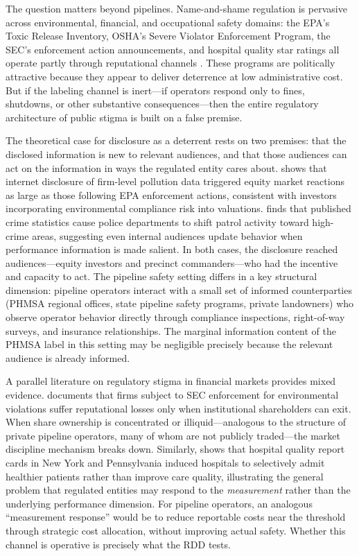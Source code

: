 \documentclass[12pt]{article}
\begin{document}
The question matters beyond pipelines. Name-and-shame regulation is pervasive across environmental, financial, and occupational safety domains: the EPA's Toxic Release Inventory, OSHA's Severe Violator Enforcement Program, the SEC's enforcement action announcements, and hospital quality star ratings all operate partly through reputational channels \citep{hamilton1995pollution, jin2003production, dranove2003more}. These programs are politically attractive because they appear to deliver deterrence at low administrative cost. But if the labeling channel is inert---if operators respond only to fines, shutdowns, or other substantive consequences---then the entire regulatory architecture of public stigma is built on a false premise.

The theoretical case for disclosure as a deterrent rests on two premises: that the disclosed information is new to relevant audiences, and that those audiences can act on the information in ways the regulated entity cares about. \citet{di2004internet} shows that internet disclosure of firm-level pollution data triggered equity market reactions as large as those following EPA enforcement actions, consistent with investors incorporating environmental compliance risk into valuations. \citet{mastrobuoni2020police} finds that published crime statistics cause police departments to shift patrol activity toward high-crime areas, suggesting even internal audiences update behavior when performance information is made salient. In both cases, the disclosure reached audiences---equity investors and precinct commanders---who had the incentive and capacity to act. The pipeline safety setting differs in a key structural dimension: pipeline operators interact with a small set of informed counterparties (PHMSA regional offices, state pipeline safety programs, private landowners) who observe operator behavior directly through compliance inspections, right-of-way surveys, and insurance relationships. The marginal information content of the PHMSA label in this setting may be negligible precisely because the relevant audience is already informed.

A parallel literature on regulatory stigma in financial markets provides mixed evidence. \citet{karpoff2005reputational} documents that firms subject to SEC enforcement for environmental violations suffer reputational losses only when institutional shareholders can exit. When share ownership is concentrated or illiquid---analogous to the structure of private pipeline operators, many of whom are not publicly traded---the market discipline mechanism breaks down. Similarly, \citet{dranove2003more} shows that hospital quality report cards in New York and Pennsylvania induced hospitals to selectively admit healthier patients rather than improve care quality, illustrating the general problem that regulated entities may respond to the \textit{measurement} rather than the underlying performance dimension. For pipeline operators, an analogous ``measurement response'' would be to reduce reportable costs near the threshold through strategic cost allocation, without improving actual safety. Whether this channel is operative is precisely what the RDD tests.
\end{document}
